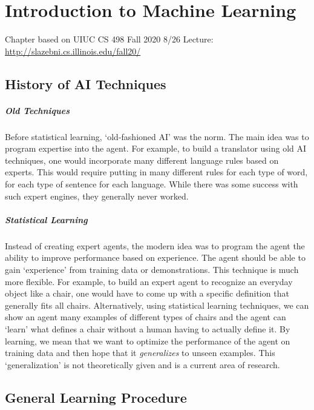 \chapter{Introduction to Machine Learning}
Chapter based on UIUC CS 498 Fall 2020 8/26 Lecture: \url{http://slazebni.cs.illinois.edu/fall20/}\\

\section{History of AI Techniques}
\paragraph{Old Techniques}
Before statistical learning, `old-fashioned AI' was the norm. The main idea was to program expertise into the agent. For example, to build a translator using old AI techniques, one would incorporate many different language rules based on experts. This would require putting in many different rules for each type of word, for each type of sentence for each language. While there was some success with such expert engines, they generally never worked. 

\paragraph{Statistical Learning}
Instead of creating expert agents, the modern idea was to program the agent the ability to improve performance based on experience. The agent should be able to gain `experience' from training data or demonstrations. This technique is much more flexible. For example, to build an expert agent to recognize an everyday object like a chair, one would have to come up with a specific definition that generally fits all chairs. Alternatively, using statistical learning techniques, we can show an agent many examples of different types of chairs and the agent can `learn' what defines a chair without a human having to actually define it. By learning, we mean that we want to optimize the performance of the agent on training data and then hope that it \textit{generalizes} to unseen examples. This `generalization' is not theoretically given and is a current area of research. 

\section{General Learning Procedure}

